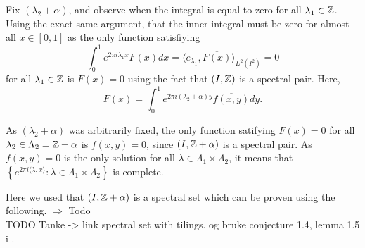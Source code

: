\documentclass[../thesis.tex]{subfiles}
\begin{document}
Fix $(\lambda_2+\alpha)$, and observe when the integral is equal to zero for all $\lambda_1\in \mathbb{Z}$. Using the exact same argument, that the inner integral must be zero for almost all $x\in[0,1]$ as the only function satisfiying 
\begin{equation*}
    \int_0^1 e^{2 \pi i \lambda_1 x} F(x)dx = \langle e_{\lambda_1}, \overline{F(x)}\rangle_{L^2(I^2)} = 0
\end{equation*}
for all $\lambda_1 \in \mathbb{Z}$ is $F(x)=0$ using the fact that $(I,\mathbb{Z})$ is a spectral pair. Here,
\begin{equation*}
    F(x) = \int_0^1 e^{2 \pi i (\lambda_2+\alpha) y} \overline{f(x,y)} dy.
\end{equation*}

As $(\lambda_2+\alpha)$ was arbitrarily fixed, the only function satifying $F(x) = 0 $ for all $\lambda_2 \in \Lambda_2=\mathbb{Z}+\alpha$ is $f(x,y)=0$, since $\left(I, \mathbb{Z}+\alpha\right)$ is a spectral pair. As $f(x,y)=0$ is the only solution for all $\lambda \in \Lambda_1 \times \Lambda_2$, it means that $\left\{ e^{2\pi i \langle \lambda,x  \rangle } : \lambda \in \Lambda_1\times\Lambda_2\right\}$ is complete. 

Here we used that $\left(I, \mathbb{Z}+\alpha\right)$ is a spectral set which can be proven using the following.
$\Longrightarrow$ Todo\\
TODO Tanke -> link spectral set with tilings. og bruke conjecture 1.4, lemma 1.5 i \cite{jorgensenSpectralPairsCartesian2001}. 




\end{document}
